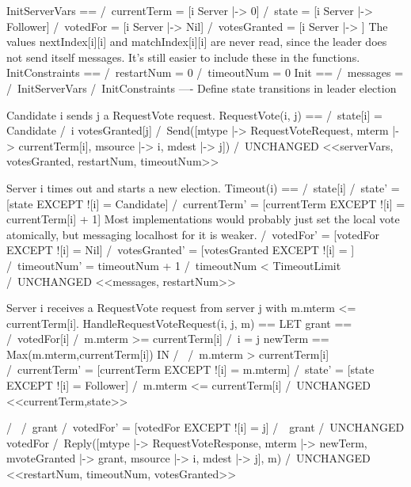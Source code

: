 InitServerVars == /\ currentTerm = [i \in Server |-> 0]
                  /\ state       = [i \in Server |-> Follower]
                  /\ votedFor    = [i \in Server |-> Nil]
                  /\ votesGranted   = [i \in Server |-> {}]
\* The values nextIndex[i][i] and matchIndex[i][i] are never read, since the
\* leader does not send itself messages. It's still easier to include these
\* in the functions.
InitConstraints == /\ restartNum = 0
                   /\ timeoutNum = 0
Init == /\ messages = {}
        /\ InitServerVars
        /\ InitConstraints
----
\* Define state transitions in leader election

\* Candidate i sends j a RequestVote request.
RequestVote(i, j) ==
    /\ state[i] = Candidate
    /\ i \notin votesGranted[j]
    /\ Send([mtype         |-> RequestVoteRequest,
             mterm         |-> currentTerm[i],
             msource       |-> i,
             mdest         |-> j])
    /\ UNCHANGED <<serverVars, votesGranted, restartNum, timeoutNum>>
                   
\* Server i times out and starts a new election.
Timeout(i) == /\ state[i] 
              /\ state' = [state EXCEPT ![i] = Candidate]
              /\ currentTerm' = [currentTerm EXCEPT 
                                ![i] = currentTerm[i] + 1]
              \* Most implementations would probably just set the local vote
              \* atomically, but messaging localhost for it is weaker.
              /\ votedFor' = [votedFor EXCEPT ![i] = Nil]
              /\ votesGranted'   = [votesGranted EXCEPT 
                                   ![i] = {}]
              /\ timeoutNum'     = timeoutNum + 1
              /\ timeoutNum      < TimeoutLimit
              /\ UNCHANGED <<messages, restartNum>>


\* Server i receives a RequestVote request from server j with
\* m.mterm <= currentTerm[i].
HandleRequestVoteRequest(i, j, m) ==
    LET grant == \/ /\ votedFor[i] 
                    /\ m.mterm >= currentTerm[i]
                 \/ /\ i = j
        newTerm == Max({m.mterm,currentTerm[i]})
    IN
       /\ \/ /\ m.mterm > currentTerm[i]
             /\ currentTerm' = [currentTerm EXCEPT ![i] = m.mterm]
             /\ state'       = [state       EXCEPT ![i] = Follower]
          \/ /\ m.mterm <= currentTerm[i]
             /\ UNCHANGED <<currentTerm,state>>
             
       /\ \/ /\ grant  
             /\ votedFor' = [votedFor EXCEPT ![i] = j]
          \/ /\ ~grant 
             /\ UNCHANGED votedFor
       /\ Reply([mtype        |-> RequestVoteResponse,
                 mterm        |-> newTerm,
                 mvoteGranted |-> grant,
                 msource      |-> i,
                 mdest        |-> j],
                 m)    
       /\ UNCHANGED <<restartNum, timeoutNum, votesGranted>>

